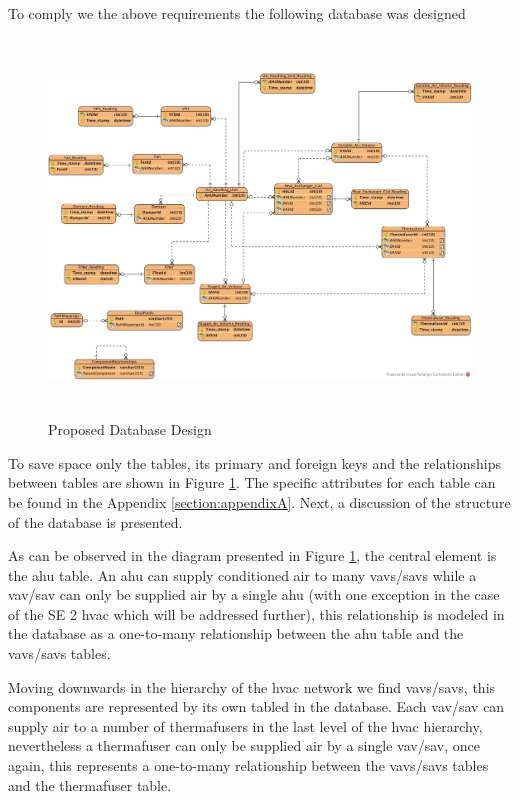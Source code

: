 To comply we the above requirements the following database was designed

\begin{figure}[H]
	\centering
  	\includegraphics[width=150mm, height=100mm]{resources/HVAC_SE2_Names.jpg}
  	\caption{Proposed Database Design}
 	\label{fig:databaseDesign}
\end{figure}

To save space only the tables, its primary and foreign keys and the relationships between tables are shown in Figure \ref{fig:databaseDesign}. The specific attributes for each table can be found in the Appendix \ref{section:appendixA}. Next, a discussion of the structure of the database is presented. 

As can be observed in the diagram presented in Figure \ref{fig:databaseDesign}, the central element is the \gls{ahu} table. An \gls{ahu} can supply conditioned air to many \glspl{vav}/\glspl{sav} while a \gls{vav}/\gls{sav} can only be supplied air by a single \gls{ahu} (with one exception in the case of the SE 2 \gls{hvac} which will be addressed further), this relationship is modeled in the database as a one-to-many relationship between the \gls{ahu} table and the \glspl{vav}/\glspl{sav} tables.

Moving downwards in the hierarchy of the \gls{hvac} network we find \glspl{vav}/\glspl{sav}, this components are represented by its own tabled in the database. Each \gls{vav}/\gls{sav} can supply air to a number of thermafusers in the last level of the \gls{hvac} hierarchy, nevertheless a thermafuser can only be supplied air by a single \gls{vav}/\gls{sav}, once again, this represents a one-to-many relationship between the \glspl{vav}/\glspl{sav} tables and the thermafuser table.

